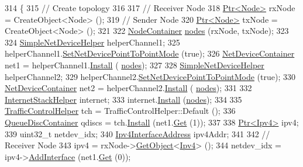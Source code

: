 \begin{DoxyCode}
314 \{
315   \textcolor{comment}{// Create topology}
316 
317   \textcolor{comment}{// Receiver Node}
318   \hyperlink{classns3_1_1Ptr}{Ptr<Node>} rxNode = CreateObject<Node> ();
319   \textcolor{comment}{// Sender Node}
320   \hyperlink{classns3_1_1Ptr}{Ptr<Node>} txNode = CreateObject<Node> ();
321 
322   \hyperlink{classns3_1_1NodeContainer}{NodeContainer} \hyperlink{visualizer-ideas_8txt_a3e1b3808014a2c68ab0cd0182e041be2}{nodes} (rxNode, txNode);
323 
324   \hyperlink{classns3_1_1SimpleNetDeviceHelper}{SimpleNetDeviceHelper} helperChannel1;
325   helperChannel1.\hyperlink{classns3_1_1SimpleNetDeviceHelper_a474460ba6942d4933f443a97df7d4716}{SetNetDevicePointToPointMode} (\textcolor{keyword}{true});
326   \hyperlink{classns3_1_1NetDeviceContainer}{NetDeviceContainer} net1 = helperChannel1.\hyperlink{classns3_1_1SimpleNetDeviceHelper_a35bed9cee32d306362d3e24dfeef4513}{Install} (
      \hyperlink{visualizer-ideas_8txt_a3e1b3808014a2c68ab0cd0182e041be2}{nodes});
327 
328   \hyperlink{classns3_1_1SimpleNetDeviceHelper}{SimpleNetDeviceHelper} helperChannel2;
329   helperChannel2.\hyperlink{classns3_1_1SimpleNetDeviceHelper_a474460ba6942d4933f443a97df7d4716}{SetNetDevicePointToPointMode} (\textcolor{keyword}{true});
330   \hyperlink{classns3_1_1NetDeviceContainer}{NetDeviceContainer} net2 = helperChannel2.\hyperlink{classns3_1_1SimpleNetDeviceHelper_a35bed9cee32d306362d3e24dfeef4513}{Install} (
      \hyperlink{visualizer-ideas_8txt_a3e1b3808014a2c68ab0cd0182e041be2}{nodes});
331 
332   \hyperlink{classns3_1_1InternetStackHelper}{InternetStackHelper} internet;
333   internet.\hyperlink{classns3_1_1InternetStackHelper_a6645b412f31283d2d9bc3d8a95cebbc0}{Install} (\hyperlink{visualizer-ideas_8txt_a3e1b3808014a2c68ab0cd0182e041be2}{nodes});
334 
335   \hyperlink{classns3_1_1TrafficControlHelper}{TrafficControlHelper} tch = TrafficControlHelper::Default ();
336   \hyperlink{classns3_1_1QueueDiscContainer}{QueueDiscContainer} qdiscs = tch.\hyperlink{classns3_1_1TrafficControlHelper_a0aa6a8e2fbb1c196589e16f48c99f0b9}{Install} (net1.\hyperlink{classns3_1_1NetDeviceContainer_a677d62594b5c9d2dea155cc5045f4d0b}{Get} (1));
337 
338   \hyperlink{classns3_1_1Ptr}{Ptr<Ipv4>} ipv4;
339   uint32\_t netdev\_idx;
340   \hyperlink{classns3_1_1Ipv4InterfaceAddress}{Ipv4InterfaceAddress} ipv4Addr;
341 
342   \textcolor{comment}{// Receiver Node}
343   ipv4 = rxNode->\hyperlink{classns3_1_1Object_a13e18c00017096c8381eb651d5bd0783}{GetObject}<\hyperlink{classns3_1_1Ipv4}{Ipv4}> ();
344   netdev\_idx = ipv4->\hyperlink{classns3_1_1Ipv4_a637354128b71bc587ea5a6eeaef42469}{AddInterface} (net1.\hyperlink{classns3_1_1NetDeviceContainer_a677d62594b5c9d2dea155cc5045f4d0b}{Get} (0));

\end{DoxyCode}
